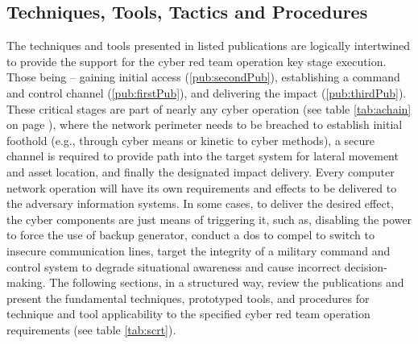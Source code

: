 \subsection{Techniques, Tools, Tactics and Procedures}
\label{sec:ttps}
The techniques and tools presented in listed publications are logically intertwined to provide the support for the cyber red team operation key stage execution. Those being -- gaining initial access (\ref{pub:secondPub}), establishing a command and control channel (\ref{pub:firstPub}), and delivering the impact (\ref{pub:thirdPub}). These critical stages are part of nearly any cyber operation (see table \ref{tab:achain} on page \pageref{tab:achain}), where the network perimeter needs to be breached to establish initial foothold (e.g., through cyber means or kinetic to cyber methods), a secure channel is required to provide path into the target system for lateral movement and asset location, and finally the designated impact delivery. Every computer network operation will have its own requirements and effects to be delivered to the adversary information systems. In some cases, to deliver the desired effect, the cyber components are just means of triggering it, such as, disabling the power to force the use of backup generator, conduct a \gls{dos} to compel to switch to insecure communication lines, target the integrity of a military command and control system to degrade situational awareness and cause incorrect decision-making.
The following sections, in a structured way, review the publications and present the fundamental techniques, prototyped tools, and procedures for technique and tool applicability to the specified cyber red team operation requirements (see table \ref{tab:scrt}).


